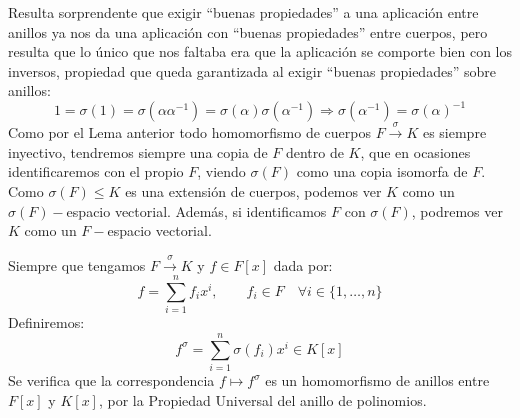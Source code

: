 \begin{observacion}
    Resulta sorprendente que exigir ``buenas propiedades'' a una aplicación entre anillos ya nos da una aplicación con ``buenas propiedades'' entre cuerpos, pero resulta que lo único que nos faltaba era que la aplicación se comporte bien con los inversos, propiedad que queda garantizada al exigir ``buenas propiedades'' sobre anillos:
    \begin{equation*}
        1 = \sigma(1) = \sigma\left(\alpha\alpha^{-1}\right) = \sigma(\alpha)\sigma\left(\alpha^{-1}\right) \Longrightarrow \sigma\left(\alpha^{-1}\right) = {\sigma(\alpha)}^{-1}
    \end{equation*}
    Como por el Lema anterior todo homomorfismo de cuerpos $F\stackrel{\sigma}{\to}K$ es siempre inyectivo, tendremos siempre una copia de $F$ dentro de $K$, que en ocasiones identificaremos con el propio $F$, viendo $\sigma(F)$ como una copia isomorfa de $F$. Como $\sigma(F)\leq K$ es una extensión de cuerpos, podemos ver $K$ como un $\sigma(F)-$espacio vectorial. Además, si identificamos $F$ con $\sigma(F)$, podremos ver $K$ como un $F-$espacio vectorial.
\end{observacion}

\begin{definicion}
    Siempre que tengamos $F\stackrel{\sigma}{\to} K$ y $f\in F[x]$ dada por:
\begin{equation*}
    f = \sum_{i=1}^{n} f_i x^i, \qquad f_i \in F \quad \forall i \in \{1,\ldots,n\}
\end{equation*}
Definiremos:
\begin{equation*}
    f^\sigma = \sum_{i=1}^{n} \sigma(f_i) x^i \in K[x]
\end{equation*}
Se verifica que la correspondencia $f\mapsto f^\sigma$ es un homomorfismo de anillos entre $F[x]$ y $K[x]$, por la Propiedad Universal del anillo de polinomios.
\end{definicion}


